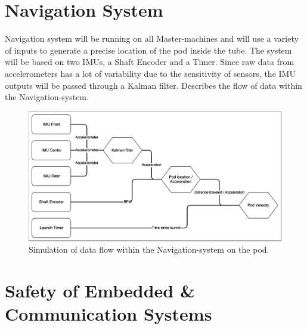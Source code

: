         
\section{Navigation System}
Navigation system will be running on all Master-machines and will use a variety of inputs to generate a precise location of the pod inside the tube. The system will be based on two IMUs, a Shaft Encoder and a Timer. Since raw data from accelerometers has a lot of variability due to the sensitivity of sensors, the IMU outputs will be passed through a Kalman filter.  Describes the flow of data within the Navigation-system.

\begin{figure}
    \centering
    \includegraphics[width=\textwidth]{images/navigation_system.png}
    \caption{Simulation of data flow within the Navigation-system on the pod.}
    \label{fig:navigation-system}
\end{figure}

\section{Safety of Embedded \& Communication Systems}
